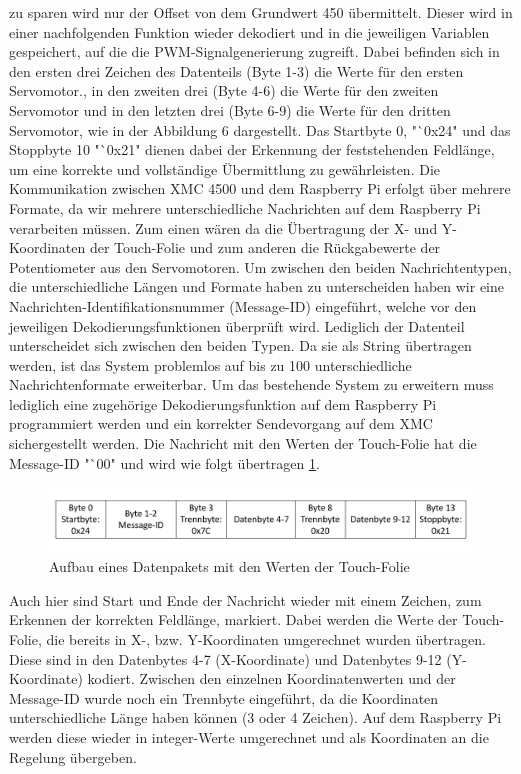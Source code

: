 \documentclass[12pt,a4paper,bibliography=totoc,listof=totoc]{scrartcl}
\begin{document}
zu sparen wird nur der Offset von dem Grundwert 450 übermittelt. Dieser wird in einer nachfolgenden 
Funktion wieder dekodiert und in die jeweiligen Variablen gespeichert, auf die die PWM-Signalgenerierung 
zugreift. Dabei befinden sich in den ersten drei Zeichen des Datenteils (Byte 1-3) die Werte für den ersten 
Servomotor., in den zweiten drei (Byte 4-6) die Werte für den zweiten Servomotor und in den letzten drei 
(Byte 6-9) die Werte für den dritten Servomotor, wie in der Abbildung 6 dargestellt. Das Startbyte 0, 
"`0x24" und das Stoppbyte 10 "`0x21" dienen dabei der Erkennung der feststehenden Feldlänge, um eine korrekte 
und vollständige Übermittlung zu gewährleisten. Die Kommunikation zwischen XMC 4500 und dem Raspberry Pi 
erfolgt über mehrere Formate, da wir mehrere unterschiedliche Nachrichten auf dem Raspberry Pi verarbeiten 
müssen. Zum einen wären da die Übertragung der X- und Y-Koordinaten der Touch-Folie und zum anderen die 
Rückgabewerte der Potentiometer aus den Servomotoren. Um zwischen den beiden Nachrichtentypen, die 
unterschiedliche Längen und Formate haben zu unterscheiden haben wir eine Nachrichten-Identifikationsnummer 
(Message-ID) eingeführt, welche vor den jeweiligen Dekodierungsfunktionen überprüft wird. Lediglich der 
Datenteil unterscheidet sich zwischen den beiden Typen. Da sie als String übertragen werden, ist das 
System problemlos auf bis zu 100 unterschiedliche Nachrichtenformate erweiterbar. Um das bestehende System 
zu erweitern muss lediglich eine zugehörige Dekodierungsfunktion auf dem Raspberry Pi programmiert werden 
und ein korrekter Sendevorgang auf dem XMC sichergestellt werden. Die Nachricht mit den Werten der 
Touch-Folie hat die Message-ID "`00" und wird wie folgt übertragen \ref{UART Platte}.
\begin{figure}[htbp]
	\centering
	\includegraphics[scale = 0.44]{pics/Uartplatte}
	\caption{Aufbau eines Datenpakets mit den Werten der Touch-Folie}
	\label{UART Platte}
\end{figure}
Auch hier sind Start und Ende der Nachricht wieder mit einem Zeichen, zum Erkennen der korrekten 
Feldlänge, markiert. Dabei werden die Werte der Touch-Folie, die bereits in X-, bzw. Y-Koordinaten 
umgerechnet wurden übertragen. Diese sind in den Datenbytes 4-7 (X-Koordinate) und Datenbytes 9-12 
(Y-Koordinate) kodiert. Zwischen den einzelnen Koordinatenwerten und der Message-ID wurde noch ein 
Trennbyte eingeführt, da die Koordinaten unterschiedliche Länge haben können (3 oder 4 Zeichen). Auf dem 
Raspberry Pi werden diese wieder in integer-Werte umgerechnet und als Koordinaten an die Regelung 
übergeben.
\end{document}

